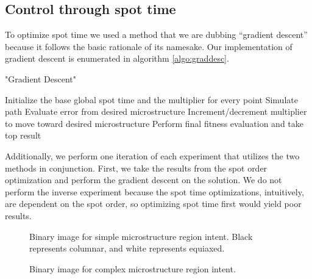 \documentclass[a4paper]{article}
\begin{document}
\subsection{Control through spot time}
\label{subsec:spottime}

To optimize spot time we used a method that we are dubbing “gradient descent” because it follows the basic rationale of its namesake. Our implementation of gradient descent is enumerated in algorithm \ref{algo:graddesc}. 

\begin{algorithm}
\caption{"Gradient Descent"}
\label{algo:graddesc}
\begin{algorithmic}[1]
\State Initialize the base global spot time and the multiplier for every point
  \State Simulate path
    \State Evaluate error from desired microstructure
    \State Increment/decrement multiplier to move toward desired microstructure
  \EndFor
\EndWhile
\State Perform final fitness evaluation and take top result
\end{algorithmic}
\end{algorithm}


Additionally, we perform one iteration of each experiment that utilizes the two methods in conjunction. First, we take the results from the spot order optimization and perform the gradient descent on the solution. We do not perform the inverse experiment because the spot time optimizations, intuitively, are dependent on the spot order, so optimizing spot time first would yield poor results. 

\begin{figure}
\centering
{}
\caption{\label{fig:intent50}Binary image for simple microstructure region intent. Black represents columnar, and white represents equiaxed.}
\end{figure}

\begin{figure}
\centering
{}
\caption{\label{fig:intentleaf}Binary image for complex microstructure region intent.}
\end{figure}
\end{document}
